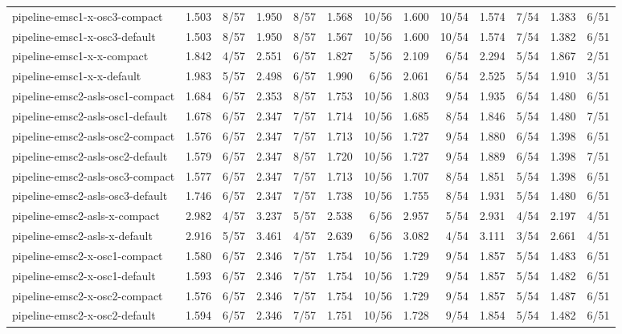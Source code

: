 \begin{tabular}{lrrrrrrrrrrrr}
pipeline-emsc1-x-osc3-compact & 1.503 & 8/57 & 1.950 & 8/57 & 1.568 & 10/56 & 1.600 & 10/54 & 1.574 & 7/54 & 1.383 & 6/51 \\
pipeline-emsc1-x-osc3-default & 1.503 & 8/57 & 1.950 & 8/57 & 1.567 & 10/56 & 1.600 & 10/54 & 1.574 & 7/54 & 1.382 & 6/51 \\
pipeline-emsc1-x-x-compact & 1.842 & 4/57 & 2.551 & 6/57 & 1.827 & 5/56 & 2.109 & 6/54 & 2.294 & 5/54 & 1.867 & 2/51 \\
pipeline-emsc1-x-x-default & 1.983 & 5/57 & 2.498 & 6/57 & 1.990 & 6/56 & 2.061 & 6/54 & 2.525 & 5/54 & 1.910 & 3/51 \\
pipeline-emsc2-asls-osc1-compact & 1.684 & 6/57 & 2.353 & 8/57 & 1.753 & 10/56 & 1.803 & 9/54 & 1.935 & 6/54 & 1.480 & 6/51 \\
pipeline-emsc2-asls-osc1-default & 1.678 & 6/57 & 2.347 & 7/57 & 1.714 & 10/56 & 1.685 & 8/54 & 1.846 & 5/54 & 1.480 & 7/51 \\
pipeline-emsc2-asls-osc2-compact & 1.576 & 6/57 & 2.347 & 7/57 & 1.713 & 10/56 & 1.727 & 9/54 & 1.880 & 6/54 & 1.398 & 6/51 \\
pipeline-emsc2-asls-osc2-default & 1.579 & 6/57 & 2.347 & 8/57 & 1.720 & 10/56 & 1.727 & 9/54 & 1.889 & 6/54 & 1.398 & 7/51 \\
pipeline-emsc2-asls-osc3-compact & 1.577 & 6/57 & 2.347 & 7/57 & 1.713 & 10/56 & 1.707 & 8/54 & 1.851 & 5/54 & 1.398 & 6/51 \\
pipeline-emsc2-asls-osc3-default & 1.746 & 6/57 & 2.347 & 7/57 & 1.738 & 10/56 & 1.755 & 8/54 & 1.931 & 5/54 & 1.480 & 6/51 \\
pipeline-emsc2-asls-x-compact & 2.982 & 4/57 & 3.237 & 5/57 & 2.538 & 6/56 & 2.957 & 5/54 & 2.931 & 4/54 & 2.197 & 4/51 \\
pipeline-emsc2-asls-x-default & 2.916 & 5/57 & 3.461 & 4/57 & 2.639 & 6/56 & 3.082 & 4/54 & 3.111 & 3/54 & 2.661 & 4/51 \\
pipeline-emsc2-x-osc1-compact & 1.580 & 6/57 & 2.346 & 7/57 & 1.754 & 10/56 & 1.729 & 9/54 & 1.857 & 5/54 & 1.483 & 6/51 \\
pipeline-emsc2-x-osc1-default & 1.593 & 6/57 & 2.346 & 7/57 & 1.754 & 10/56 & 1.729 & 9/54 & 1.857 & 5/54 & 1.482 & 6/51 \\
pipeline-emsc2-x-osc2-compact & 1.576 & 6/57 & 2.346 & 7/57 & 1.754 & 10/56 & 1.729 & 9/54 & 1.857 & 5/54 & 1.487 & 6/51 \\
pipeline-emsc2-x-osc2-default & 1.594 & 6/57 & 2.346 & 7/57 & 1.751 & 10/56 & 1.728 & 9/54 & 1.854 & 5/54 & 1.482 & 6/51 \\

\end{tabular}

